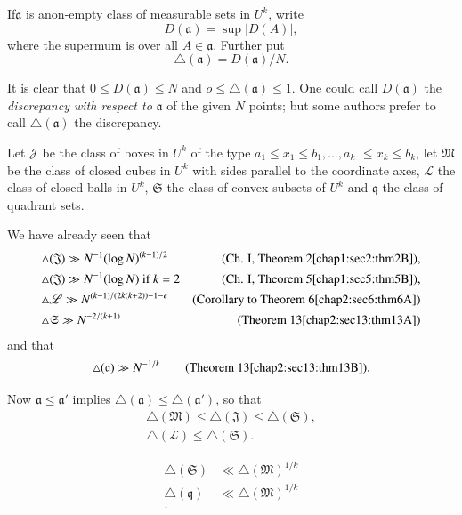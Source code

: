 If\pageoriginale $\mathfrak{a}$ is anon-empty class of measurable sets in $U^{k}$, write
$$
D(\mathfrak{a}) = \sup |D(A)|,
$$
where the supermum is over all $A \in \mathfrak{a}$. Further put
$$
\triangle (\mathfrak{a}) = D(\mathfrak{a})/N.
$$

It is clear that $0 \leq D(\mathfrak{a}) \leq N$ and $o \leq \triangle (\mathfrak{a}) \leq 1$. One could call $D(\mathfrak{a})$ the {\em discrepancy with respect to} $\mathfrak{a}$ of the given $N$ points; but some authors prefer to call $\triangle (\mathfrak{a})$ the discrepancy.

Let $\mathscr{J}$ be the class of boxes in $U^{k}$ of the type $a_{1} \leq x_{1} \leq b_{1}, \ldots, a_{k}$ $\leq x_{k} \leq b_{k}$, let $\mathfrak{M}$ be the class of closed cubes in $U^{k}$ with sides parallel to the coordinate axes, $\mathscr{L}$ the class of closed balls in $U^{k}$, $\mathfrak{S}$ the class of convex subsets of $U^{k}$ and $\mathfrak{q}$ the class of quadrant sets.

We have already seen that
\begin{align*}
& \triangle(\mathfrak{J}) \gg N^{-1}(\log N)^{(k-1)/2}  & \text{(Ch. I, Theorem 2\ref{chap1:sec2:thm2B})},\\
& \triangle(\mathfrak{J}) \gg N^{-1}(\log N) \text{ if } k = 2  & \text{(Ch. I, Theorem 5\ref{chap1:sec5:thm5B})},\\
& \triangle{\mathscr{L}} \gg N^{(k-1)/(2k(k+2))-1-\epsilon} & \text{(Corollary to Theorem 6\ref{chap2:sec6:thm6A})}\\
& \triangle{\mathfrak{S}} \gg N^{-2/(k+1)} & \text{(Theorem 13\ref{chap2:sec13:thm13A})}
\end{align*}
and that
$$
\triangle(\mathfrak{q}) \gg N^{-1/k} \qquad (\text{Theorem 13\ref{chap2:sec13:thm13B}}).
$$

Now $\mathfrak{a} \leq \mathfrak{a}'$ implies $\triangle(\mathfrak{a}) \leq \triangle(\mathfrak{a}')$, so that
\begin{align*}
\triangle(\mathfrak{M}) \leq \triangle(\mathfrak{J}) \leq \triangle (\mathfrak{S}),\\
\triangle (\mathscr{L}) \leq \triangle (\mathfrak{S}).
\end{align*}

\begin{theorem}\label{chap2:sec14:thm14A}
\begin{align*}
\triangle (\mathfrak{S}) & \ll \triangle(\mathfrak{M})^{1/k}\\
\triangle (\mathfrak{q}) & \ll \triangle(\mathfrak{M})^{1/k}\\.
\end{align*}\pageoriginale
\end{theorem}

